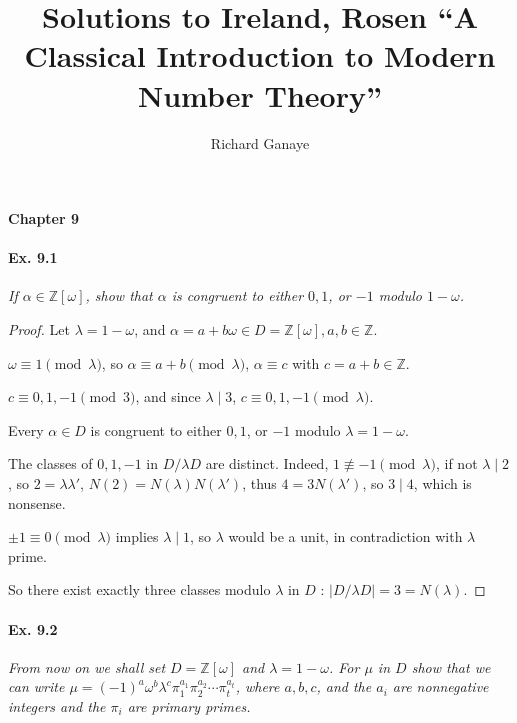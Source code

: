 \documentclass[11pt,a4paper]{article}
\title{Solutions to Ireland, Rosen ``A Classical Introduction to Modern Number Theory''}
\author{Richard Ganaye}
\newcommand{\Z}{\mathbb{Z}}
\begin{document}
\maketitle


{ \Large \bf Chapter 9} 

\paragraph{Ex. 9.1}

{\it If $\alpha \in \Z[\omega]$, show that $\alpha$ is congruent to either $0,1$, or $-1$ modulo $1-\omega$.
}

\begin{proof}
Let $\lambda = 1 - \omega$, and $\alpha = a+b\omega \in D = \Z[\omega], a,b \in \Z$.

$\omega \equiv 1 \pmod \lambda$, so $\alpha \equiv a+b \pmod \lambda$, $\alpha \equiv c$ with $c = a+b \in \Z$.

$c\equiv 0,1,-1 \pmod 3$, and since $\lambda \mid 3$, $c \equiv 0,1,-1 \pmod \lambda$.

 Every $\alpha \in D$ is congruent to either $0,1$, or $-1$ modulo $\lambda = 1 -\omega$.

The classes of $0,1,-1$ in $D/\lambda D$ are distinct. Indeed, $1\not \equiv -1 \pmod \lambda$, if not $\lambda \mid 2$, so $2 = \lambda \lambda'$, $N(2) = N(\lambda) N(\lambda')$, thus $4 = 3 N(\lambda')$, so $3 \mid 4$, which is nonsense.

$\pm1 \equiv 0 \pmod \lambda$ implies $\lambda \mid 1$, so $\lambda$ would be a unit, in contradiction with $\lambda$ prime.

So there exist exactly three classes modulo $\lambda$ in $D$ : $ | D/\lambda D | = 3 = N(\lambda)$.

\end{proof}

\paragraph{Ex. 9.2}

{\it From now on we shall set $D = \Z[\omega]$ and $\lambda = 1 - \omega$. For $\mu$ in $D$ show that we can write $\mu = (-1)^a \omega^b \lambda^c\pi_1^{a_1}\pi_2^{a_2}\cdots\pi_t^{a_t}$, where $a,b,c$, and the $a_i$ are nonnegative integers and the $\pi_i$ are primary primes.
}
\end{document}
